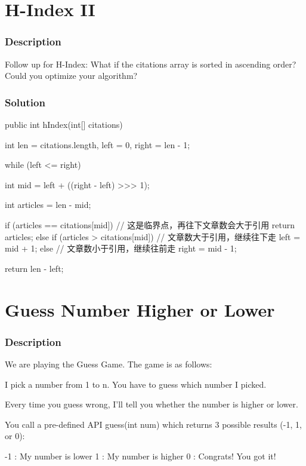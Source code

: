 \newpage

\section{H-Index II} %

\subsubsection{Description}
Follow up for H-Index: What if the citations array is sorted in ascending order? Could you optimize your algorithm?

\subsubsection{Solution}

\begin{Code}
public int hIndex(int[] citations) {
    int len = citations.length, left = 0, right = len - 1;

    while (left <= right) {
        int mid = left + ((right - left) >>> 1);

        int articles = len - mid;

        if (articles == citations[mid]) {
            // 这是临界点，再往下文章数会大于引用
            return articles;
        } else if (articles > citations[mid]) {
            // 文章数大于引用，继续往下走
            left = mid + 1;
        } else {
            // 文章数小于引用，继续往前走
            right = mid - 1;
        }
    }

    return len - left;
}
\end{Code}

\newpage

\section{Guess Number Higher or Lower} %

\subsubsection{Description}
We are playing the Guess Game. The game is as follows:

I pick a number from 1 to n. You have to guess which number I picked.

Every time you guess wrong, I'll tell you whether the number is higher or lower.

You call a pre-defined API guess(int num) which returns 3 possible results (-1, 1, or 0):
\begin{Code}
-1 : My number is lower
 1 : My number is higher
 0 : Congrats! You got it!
\end{Code}

